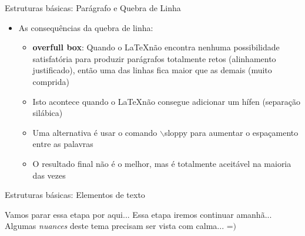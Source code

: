 \begin{frame}{Estruturas básicas: Parágrafo e Quebra de Linha}
    \begin{itemize}
        \item  As consequências da quebra de linha:
        \begin{itemize}        
            \item \textbf{overfull box}: Quando o \LaTeX não encontra nenhuma possibilidade satisfatória para produzir parágrafos totalmente retos (alinhamento justificado), então uma das linhas fica maior que as demais (muito comprida)
            \item Isto acontece quando o \LaTeX não consegue adicionar um hífen (separação silábica)
            \item Uma alternativa é usar o comando $\backslash$sloppy para aumentar o espaçamento entre as palavras
            \item O resultado final não é o melhor, mas é totalmente aceitável na maioria das vezes            
        \end{itemize}
    \end{itemize}
\end{frame}

\begin{frame}{Estruturas básicas: Elementos de texto}
    \begin{alertblock}{Vamos parar essa etapa por aqui... }
        Essa etapa iremos continuar amanhã... \\
        Algumas \textit{nuances} deste tema precisam ser vista com calma... =$)$
    \end{alertblock}
\end{frame}